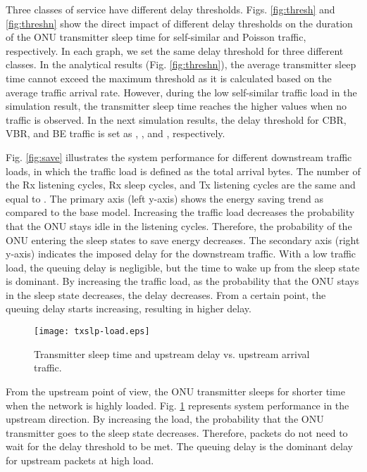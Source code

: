 \documentclass[11pt,english,12pt,onecolumn, draftcls]{IEEEtran}
\theoremstyle{plain}
\theoremstyle{definition}
\begin{document}
Three classes of service have different delay thresholds. Figs. \ref{fig:thresh} and \ref{fig:threshn} show the direct impact of different delay thresholds on the duration of the ONU transmitter sleep time for self-similar and Poisson traffic, respectively. In each graph, we set the same delay threshold for three different classes. In the analytical results (Fig. \ref{fig:threshn}), the average transmitter sleep time cannot exceed the maximum threshold as it is calculated based on the average traffic arrival rate. However, during the low self-similar traffic load in the simulation result, the transmitter sleep time reaches the higher values when no traffic is observed. In the next simulation results, the delay threshold for CBR, VBR, and BE traffic is set as , , and , respectively.


Fig. \ref{fig:save} illustrates the system performance for different downstream traffic loads, in which the traffic load is defined as the total arrival bytes. The number of the Rx listening cycles, Rx sleep cycles, and Tx listening cycles are the same and equal to . The primary axis (left y-axis) shows the energy saving trend as compared to the base model. Increasing the traffic load decreases the probability that the ONU stays idle in the listening cycles. Therefore, the probability of the ONU entering the sleep states to save energy decreases. The secondary axis (right y-axis) indicates the imposed delay for the downstream traffic. With a low traffic load, the queuing delay is negligible, but the time to wake up from the sleep state is dominant. By increasing the traffic load, as the probability that the ONU stays in the sleep state decreases, the delay decreases. From a certain point, the queuing delay starts increasing, resulting in higher delay.

\vspace{-.15in}
\begin{figure}
\centering
\texttt{[image: txslp-load.eps]}
\caption{Transmitter sleep time and upstream delay vs. upstream arrival traffic.}
\label{fig:ts-load}
\vspace{-.2in}
\end{figure}
\vspace{.2in}

From the upstream point of view, the ONU transmitter sleeps for shorter time when the network is highly loaded. Fig. \ref{fig:ts-load} represents system performance in the upstream direction. By increasing the load, the probability that the ONU transmitter goes to the sleep state decreases. Therefore, packets do not need to wait for the delay threshold to be met. The queuing delay is the dominant delay for upstream packets at high load.
\end{document}
